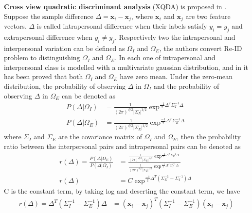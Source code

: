\textbf{Cross view quadratic discriminant analysis} (XQDA) is proposed in \cite{LOMO}. Suppose the sample difference $\Delta = \bm{x}_i - \bm{x}_j$, where $\bm{x}_i $ and $\bm{x}_j$ are two feature vectors. $\Delta$ is called intrapersonal difference when their labels satisfy $y_i = y_j$ and extrapersonal difference when $y_i \ne y_j$. Respectively two the intrapersonal and interpersonal variation can be defined as $\Omega_I$ and $\Omega_E$, the authors convert Re-ID problem to distinguishing $\Omega_I$ and $\Omega_E$. In \cite{Bayeface}  each one of intrapersonal and interpersonal class is modelled with a multivariate gaussian distribution, and in \cite{Bayeface} it has been proved that both $\Omega_I$ and $\Omega_E$ have zero mean. Under the zero-mean distribution, the probability of observing $\Delta$ in $\Omega_I$ and the probability of observing $\Delta$ in $\Omega_E$ can be denoted as
\begin{equation}
\begin{aligned}
P(\Delta|\Omega_I) &= \frac{1}{(2\pi)^{d/2}|\Sigma_I|^{1/2}}\exp^{\frac{-1}{2}\Delta^T\Sigma_I^{-1}\Delta}\\
P(\Delta|\Omega_E) &= \frac{1}{(2\pi)^{d/2}|\Sigma_E|^{1/2}}\exp^{\frac{-1}{2}\Delta^T\Sigma_E^{-1}\Delta}
\end{aligned}
\end{equation}
where $\Sigma_I$ and $\Sigma_E$ are the covariance matrix of $\Omega_I$ and $\Omega_E$, then the probability ratio between the interpersonal pairs and intrapersonal pairs can be denoted as
\begin{equation}
\begin{aligned}
r(\Delta) = \frac{P(\Delta|\Omega_E)}{P(\Delta|\Omega_I)}
	   &=\frac{\frac{1}{(2\pi)^{d/2}|\Sigma_E|^{1/2}}\exp^{\frac{-1}{2}\Delta^T\Sigma_E^{-1}\Delta}}{\frac{1}{(2\pi)^{d/2}|\Sigma_I|^{1/2}}\exp^{\frac{-1}{2}\Delta^T\Sigma_I^{-1}\Delta}}\\
r(\Delta)& =  C\exp^{\frac{-1}{2}\Delta^T(\Sigma_E^{-1} - \Sigma_I^{-1})\Delta}
\end{aligned}
\end{equation}
C is the constant term, by taking log and deserting the constant term, we have 
\begin{equation}
\begin{aligned}
r(\Delta) = \Delta^T(\Sigma_I^{-1} - \Sigma_E^{-1})\Delta 
	   & = (\bm{x}_i - \bm{x}_j)^T(\Sigma_I^{-1} - \Sigma_E^{-1})(\bm{x}_i - \bm{x}_j)
\end{aligned}
\end{equation}
